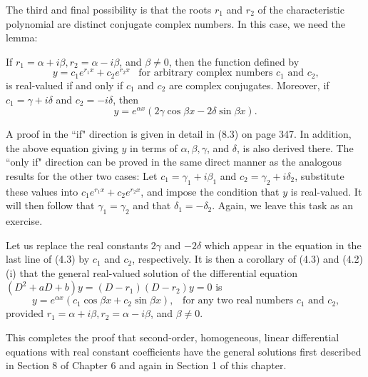 The third and final possibility is that the roots $r_1$ and $r_2$ of the characteristic polynomial are distinct conjugate complex numbers. In this case, we need the lemma:

\begin{theorem}  If $r_1 = \alpha + i\beta, r_2 = \alpha - i\beta$, and $\beta \neq 0$, then the function defined by
$$
y = c_1e^{r_1x} + c_2e^{r_2x} \;\;\;\mbox{for arbitrary complex numbers $c_1$ and $c_2$,}
$$
is real-valued if and only if $c_1$ and $c_2$ are complex conjugates. Moreover, if $c_1 = \gamma + i \delta$ and $c_2 = - i \delta$, then
$$
y= e^{\alpha x}(2 \gamma \cos \beta x - 2 \delta \sin \beta x).
$$
\end{theorem}

A proof in the ``if" direction is given in detail in (8.3) on page 347. In addition, the above equation giving $y$ in terms of $\alpha, \beta, \gamma$,  and $\delta$, is also derived there. The ``only if" direction can be proved in the same direct manner as the analogous results for the other two cases: Let $c_1 = \gamma_1 + i\beta_1$ and $c_2 = \gamma_2 + i\delta_2$, substitute these values into $c_1e^{r_1 x} + c_2e^{r_2 x}$, and impose the condition that $y$ is real-valued. It will then follow that $\gamma_1 = \gamma_2$ and that $\delta_1 = -\delta_2$. Again, we leave this task as an exercise.

Let us replace the real constants $2\gamma$ and $-2\delta$ which appear in the equation in the last line of (4.3) by $c_1$ and $c_2$, respectively. It is then a corollary of (4.3) and (4.2)(i) that the general real-valued solution of the differential equation $(D^2 + aD + b)y = (D - r_1)(D - r_2)y = 0$ is
\begin{equation}
y = e^{\alpha x}(c_1 \cos \beta x + c_2 \sin \beta x), \;\;\;\mbox{for any two real numbers $c_1$ and $c_2$,} 
\label{eq11.4.8}
\end{equation}
provided $r_1 = \alpha + i\beta, r_2 = \alpha - i\beta$, and $\beta \neq 0$.

This completes the proof that second-order, homogeneous, linear differential equations with real constant coefficients have the general solutions first described in Section 8 of Chapter 6 and again in Section 1 of this chapter.

